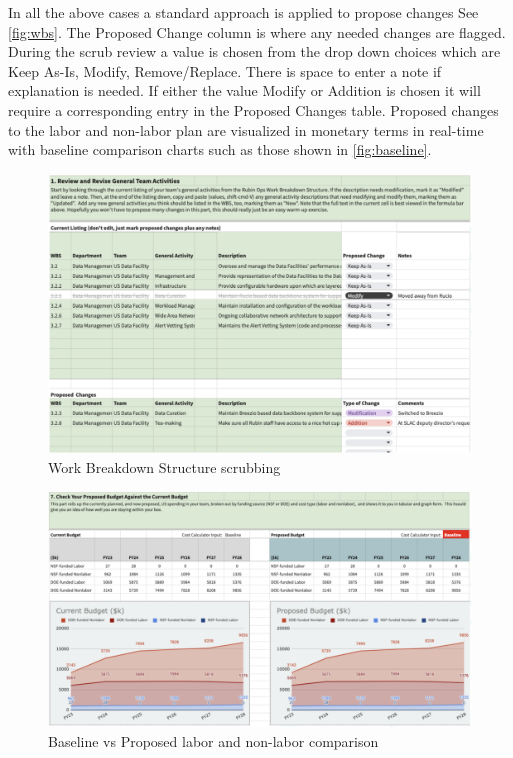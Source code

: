 In all the above cases a standard approach is applied to propose changes See \autoref{fig:wbs}. The Proposed Change column is where any needed changes are flagged. During the scrub review a value is chosen from the drop down choices which are Keep As-Is, Modify, Remove/Replace. There is space to enter a note if explanation is needed.
If either the value Modify or Addition is chosen it will require a corresponding entry in the Proposed Changes table.
Proposed changes to the labor and non-labor plan are visualized in monetary terms in real-time with baseline comparison charts such as those shown in \autoref{fig:baseline}.



\begin{figure}[h!]
\begin{centering}
\includegraphics[width=1.0\textwidth]{Figure4WorkBreakdownStructurescrubbing}
	\caption{ Work Breakdown Structure scrubbing
\label{fig:wbs}}
\end{centering}
\end{figure}

\begin{figure}[h!]
\begin{centering}
\includegraphics[width=1.0\textwidth]{Figure5BaselinevsProposed}
	\caption{Baseline vs Proposed labor and non-labor comparison
\label{fig:baseline}}
\end{centering}
\end{figure}
